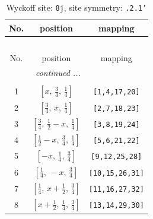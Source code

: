 \documentclass[fleqn,8pt]{jsarticle}
\begin{document}
\begin{longtable}{ccc}
\caption{Wyckoff site: {\tt 8j}, site symmetry: {\tt .2.1'}}
 \\
 \hline \hline
No. & position & mapping \\ \hline \endfirsthead

\multicolumn{2}{l}{\tablename\ \thetable{}} \\
 \hline \hline
No. & position & mapping \\ \hline \endhead

 \hline \hline
\multicolumn{2}{r}{\footnotesize\it continued ...} \\ \endfoot

 \hline \hline
\multicolumn{2}{r}{} \\ \endlastfoot

1 & $\left[ x,\, \frac{3}{4},\, \frac{1}{4} \right]$ & {\tt [1,4,17,20]} \\ \hline
2 & $\left[ \frac{3}{4},\, x,\, \frac{1}{4} \right]$ & {\tt [2,7,18,23]} \\ \hline
3 & $\left[ \frac{3}{4},\, \frac{1}{2} - x,\, \frac{1}{4} \right]$ & {\tt [3,8,19,24]} \\ \hline
4 & $\left[ \frac{1}{2} - x,\, \frac{3}{4},\, \frac{1}{4} \right]$ & {\tt [5,6,21,22]} \\ \hline
5 & $\left[ - x,\, \frac{1}{4},\, \frac{3}{4} \right]$ & {\tt [9,12,25,28]} \\ \hline
6 & $\left[ \frac{1}{4},\, - x,\, \frac{3}{4} \right]$ & {\tt [10,15,26,31]} \\ \hline
7 & $\left[ \frac{1}{4},\, x + \frac{1}{2},\, \frac{3}{4} \right]$ & {\tt [11,16,27,32]} \\ \hline
8 & $\left[ x + \frac{1}{2},\, \frac{1}{4},\, \frac{3}{4} \right]$ & {\tt [13,14,29,30]} \\
\end{longtable}
\renewcommand{\arraystretch}{1.2}
\end{document}
